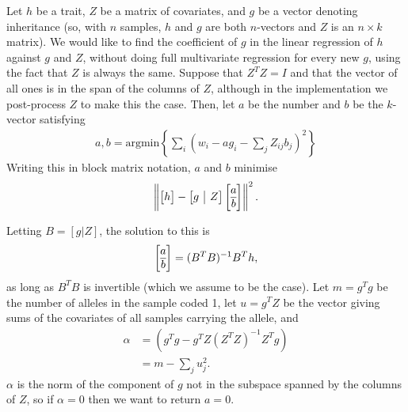 \documentclass{article}
\begin{document}
Let $h$ be a trait, $Z$ be a matrix of covariates, and $g$ be a vector denoting inheritance
(so, with $n$ samples, $h$ and $g$ are both $n$-vectors and $Z$ is an $n \times k$ matrix).
We would like to find the coefficient of $g$ in the linear regression of $h$ against $g$ and $Z$,
without doing full multivariate regression for every new $g$,
using the fact that $Z$ is always the same.
Suppose that $Z^T Z = I$ and that the vector of all ones is in the span of the columns of $Z$,
although in the implementation we post-process $Z$ to make this the case.
Then, let $a$ be the number and $b$ be the $k$-vector satisfying
\begin{align*}
    a, b = \text{argmin}\left\{ \sum_i \left( w_i - a g_i - \sum_j Z_{ij} b_j \right)^2 \right\}
\end{align*}
Writing this in block matrix notation, $a$ and $b$ minimise
\begin{align*}
    \left\|
        \left[ \begin{array}{@{}c@{}} h \end{array}\right]
            -
        \left[ \begin{array}{@{}c|c@{}} g & Z \end{array} \right]
            \left[ \begin{array}{@{}c@{}} a \\ \hline b \end{array} \right]
    \right\|^2 .
\end{align*}


Letting $B = [g | Z]$, the solution to this is
\begin{align*}
    \left[\begin{array}{@{}c@{}}a\\\hline b\end{array}\right]
        = (B^T B)^{-1} B^T h ,
\end{align*}
as long as $B^T B$ is invertible (which we assume to be the case).
Let $m = g^T g$ be the number of alleles in the sample coded 1,
let $u = g^T Z$ be the vector giving sums of the covariates of all samples carrying the allele,
and
\begin{align*}
    \alpha
    &=
        (g^T g - g^T Z (Z^T Z)^{-1} Z^T g) \\
    &=
        m - \sum_j u_j^2 .
\end{align*}
$\alpha$ is the norm of the component of $g$ not in the subspace spanned by the columns of $Z$,
so if $\alpha = 0$ then we want to return $a=0$.
\end{document}
